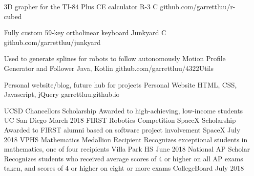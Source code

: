 \documentclass[]{awesome-cv}
\begin{document}
\vspace{-7mm}
\begin{cventries}
	\cventry
	{3D grapher for the TI-84 Plus CE calculator}
	{R-3}
	{C}
	{github.com/garrettluu/r-cubed}
	{}
	
	\vspace{-5mm}
	\cventry
	{Fully custom 59-key ortholinear keyboard}
	{Junkyard}
	{C}
	{github.com/garrettluu/junkyard}
	{}
	
	\vspace{-5mm}
	\cventry
	{Used to generate splines for robots to follow autonomously}
	{Motion Profile Generator and Follower}
	{Java, Kotlin}
	{github.com/garrettluu/4322Utils}
	{}

	
	\vspace{-5mm}
	\cventry
	{Personal website/blog, future hub for projects}
	{Personal Website}
	{HTML, CSS, Javascript, jQuery}
	{garrettluu.github.io}
	{}
	

\end{cventries}
\begin{cvhonors}
	\cvhonor
	{UCSD Chancellor\textquotesingle{}s Scholarship}
	{Awarded to high-achieving, low-income students}
	{UC San Diego}
	{March 2018}
	\cvhonor
	{FIRST Robotics Competition SpaceX Scholarship}
	{Awarded to FIRST alumni based on software project involvement}
	{SpaceX}
	{July 2018}
	\cvhonor
	{VPHS Mathematics Medallion Recipient}
	{Recognizes exceptional students in mathematics, one of four recipients}
	{Villa Park HS}
	{June 2018}
	\cvhonor
	{National AP Scholar}
	{Recognizes students who received average scores of 4 or higher on all AP exams taken, and scores of 4 or higher on eight or more exams}
	{CollegeBoard}
	{July 2018}
\end{cvhonors}
\end{document}
